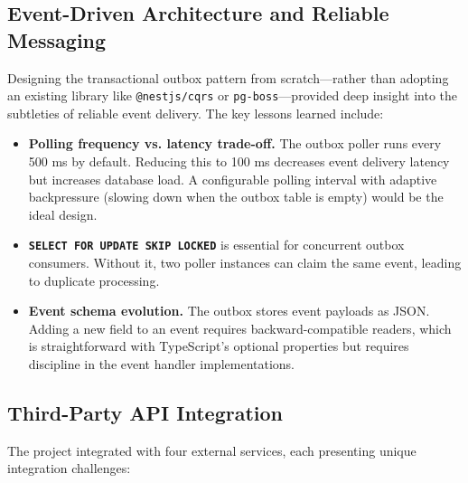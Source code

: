 \subsection{Event-Driven Architecture and Reliable Messaging}

Designing the transactional outbox pattern from scratch---rather than adopting an existing library like \texttt{@nestjs/cqrs} or \texttt{pg-boss}---provided deep insight into the subtleties of reliable event delivery. The key lessons learned include:

\begin{itemize}
  \item \textbf{Polling frequency vs. latency trade-off.} The outbox poller runs every 500 ms by default. Reducing this to 100 ms decreases event delivery latency but increases database load. A configurable polling interval with adaptive backpressure (slowing down when the outbox table is empty) would be the ideal design.
  \item \textbf{\texttt{SELECT FOR UPDATE SKIP LOCKED}} is essential for concurrent outbox consumers. Without it, two poller instances can claim the same event, leading to duplicate processing.
  \item \textbf{Event schema evolution.} The outbox stores event payloads as JSON. Adding a new field to an event requires backward-compatible readers, which is straightforward with TypeScript's optional properties but requires discipline in the event handler implementations.
\end{itemize}

\subsection{Third-Party API Integration}

The project integrated with four external services, each presenting unique integration challenges:

